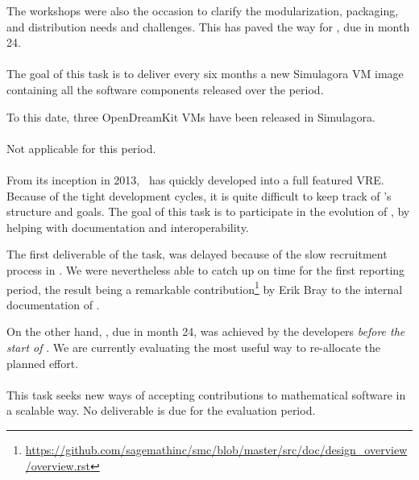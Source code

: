 \documentclass{deliverablereport}
\begin{document}
  The workshops were also the occasion to clarify the modularization,
  packaging, and distribution needs and challenges. This has paved the
  way for , due
  in month 24.
  
  \paragraph{}
  The goal of this task is to deliver every six months a new Simulagora
  VM image containing all the software components released over the
  period.

  To this date, three OpenDreamKit VMs have been released in
  Simulagora.
  
  \paragraph{}
Not applicable for this period.

  \paragraph{}
  \label{component-architecture@extract-smc}
  From its inception in 2013, \SMC\ has quickly developed into a full
  featured VRE.  Because of the tight
  development cycles, it is quite difficult to keep track of \SMC's
  structure and goals.  The goal of this task is to participate in the
  evolution of \SMC, by helping with documentation and
  interoperability.

  The first deliverable of the task,
   was delayed
  because of the slow recruitment process in . We were nevertheless able
  to catch up on time for the first reporting period, the result being
  a remarkable
  contribution\footnote{\url{https://github.com/sagemathinc/smc/blob/master/src/doc/design_overview/overview.rst}}
  by Erik Bray to the internal documentation of \SMC.
  
  On the other hand,
  , due in month
  24, was achieved by the \SMC developers \emph{before the start of
    \ODK}. We are currently evaluating the most useful way to
  re-allocate the planned effort.
  
  \paragraph{}
  This task seeks new ways of accepting contributions to mathematical
  software in a scalable way.  No deliverable is due for the
  evaluation period.
  
\end{document}
